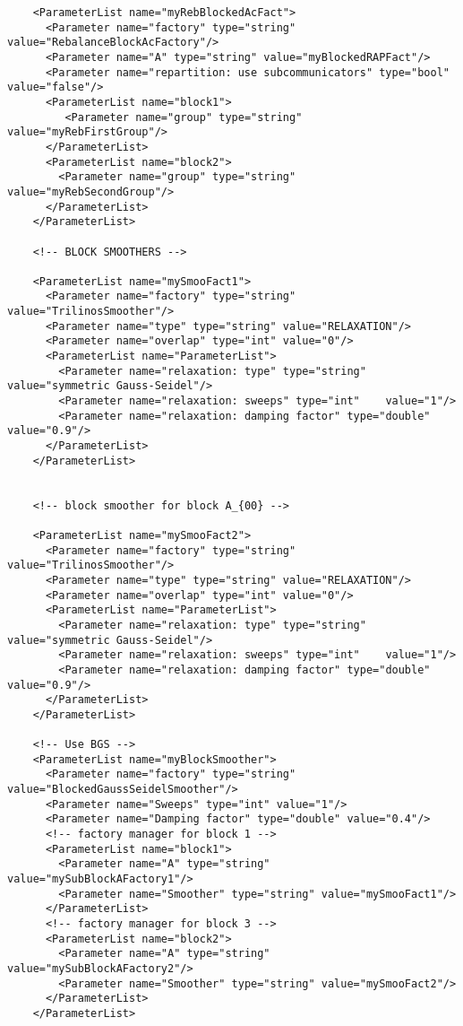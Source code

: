 \documentclass[10pt,fleqn]{book}
\begin{document}
\begin{lstlisting}
    <ParameterList name="myRebBlockedAcFact">
      <Parameter name="factory" type="string" value="RebalanceBlockAcFactory"/>
      <Parameter name="A" type="string" value="myBlockedRAPFact"/>
      <Parameter name="repartition: use subcommunicators" type="bool" value="false"/>
      <ParameterList name="block1">
         <Parameter name="group" type="string" value="myRebFirstGroup"/>
      </ParameterList>
      <ParameterList name="block2">
        <Parameter name="group" type="string" value="myRebSecondGroup"/>
      </ParameterList>
    </ParameterList>

    <!-- BLOCK SMOOTHERS -->

    <ParameterList name="mySmooFact1">
      <Parameter name="factory" type="string" value="TrilinosSmoother"/>
      <Parameter name="type" type="string" value="RELAXATION"/>
      <Parameter name="overlap" type="int" value="0"/>
      <ParameterList name="ParameterList">
        <Parameter name="relaxation: type" type="string" value="symmetric Gauss-Seidel"/>
        <Parameter name="relaxation: sweeps" type="int"    value="1"/>
        <Parameter name="relaxation: damping factor" type="double" value="0.9"/>
      </ParameterList>
    </ParameterList>


    <!-- block smoother for block A_{00} -->

    <ParameterList name="mySmooFact2">
      <Parameter name="factory" type="string" value="TrilinosSmoother"/>
      <Parameter name="type" type="string" value="RELAXATION"/>
      <Parameter name="overlap" type="int" value="0"/>
      <ParameterList name="ParameterList">
        <Parameter name="relaxation: type" type="string" value="symmetric Gauss-Seidel"/>
        <Parameter name="relaxation: sweeps" type="int"    value="1"/>
        <Parameter name="relaxation: damping factor" type="double" value="0.9"/>
      </ParameterList>
    </ParameterList>

    <!-- Use BGS -->
    <ParameterList name="myBlockSmoother">
      <Parameter name="factory" type="string" value="BlockedGaussSeidelSmoother"/>
      <Parameter name="Sweeps" type="int" value="1"/>
      <Parameter name="Damping factor" type="double" value="0.4"/>
      <!-- factory manager for block 1 -->
      <ParameterList name="block1">
        <Parameter name="A" type="string" value="mySubBlockAFactory1"/>
        <Parameter name="Smoother" type="string" value="mySmooFact1"/>
      </ParameterList>
      <!-- factory manager for block 3 -->
      <ParameterList name="block2">
        <Parameter name="A" type="string" value="mySubBlockAFactory2"/>
        <Parameter name="Smoother" type="string" value="mySmooFact2"/>
      </ParameterList>
    </ParameterList>


\end{lstlisting}
\end{document}
